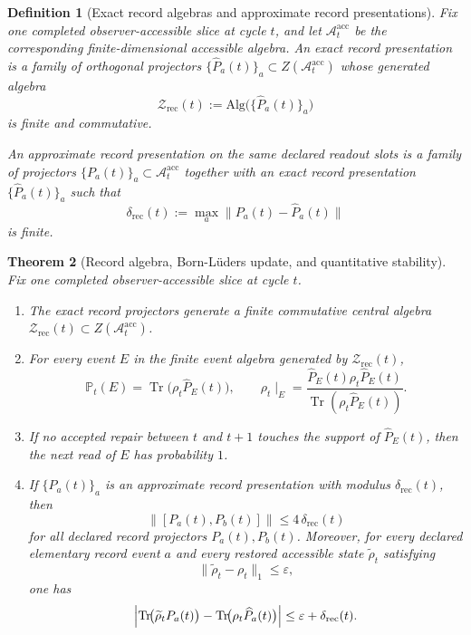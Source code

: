 \documentclass[11pt]{article}
\newtheorem{theorem}{Theorem}[section]
\newtheorem{definition}[theorem]{Definition}
\theoremstyle{remark}
\theoremstyle{plain}
\begin{document}
\begin{definition}[Exact record algebras and approximate record presentations]\label{def:lattice}
Fix one completed observer-accessible slice at cycle \(t\), and let
\(\mathcal A_t^{\mathrm{acc}}\) be the corresponding finite-dimensional accessible algebra. An
\emph{exact record presentation} is a family of orthogonal projectors
\(\{\widehat P_a(t)\}_a\subset Z(\mathcal A_t^{\mathrm{acc}})\) whose generated algebra
\[
\mathcal Z_{\mathrm{rec}}(t)
:=
\mathrm{Alg}\bigl(\{\widehat P_a(t)\}_a\bigr)
\]
is finite and commutative.

An \emph{approximate record presentation} on the same declared readout slots is a family of
projectors \(\{P_a(t)\}_a\subset \mathcal A_t^{\mathrm{acc}}\) together with an exact record
presentation \(\{\widehat P_a(t)\}_a\) such that
\[
\delta_{\mathrm{rec}}(t)
:=
\max_a \|P_a(t)-\widehat P_a(t)\|
\]
is finite.
\end{definition}

\begin{theorem}[Record algebra, Born-L\"uders update, and quantitative stability]\label{thm:crdt}
Fix one completed observer-accessible slice at cycle \(t\).
\begin{enumerate}
\item The exact record projectors generate a finite commutative central algebra
\(\mathcal Z_{\mathrm{rec}}(t)\subset Z(\mathcal A_t^{\mathrm{acc}})\).
\item For every event \(E\) in the finite event algebra generated by \(\mathcal Z_{\mathrm{rec}}(t)\),
\[
\mathbb P_t(E)=\operatorname{Tr}\!\bigl(\rho_t \widehat P_E(t)\bigr),
\qquad
\rho_t\!\mid_E
=
\frac{\widehat P_E(t)\rho_t \widehat P_E(t)}
{\operatorname{Tr}(\rho_t \widehat P_E(t))}.
\]
\item If no accepted repair between \(t\) and \(t+1\) touches the support of \(\widehat P_E(t)\),
then the next read of \(E\) has probability \(1\).
\item If \(\{P_a(t)\}_a\) is an approximate record presentation with modulus
\(\delta_{\mathrm{rec}}(t)\), then
\[
\|[P_a(t),P_b(t)]\|\le 4\,\delta_{\mathrm{rec}}(t)
\]
for all declared record projectors \(P_a(t),P_b(t)\). Moreover, for every declared elementary
record event \(a\) and every restored accessible state \(\widetilde\rho_t\) satisfying
\[
\|\widetilde\rho_t-\rho_t\|_1\le \varepsilon,
\]
one has
\[
\Bigl|
\operatorname{Tr}\!\bigl(\widetilde\rho_t P_a(t)\bigr)
-
\operatorname{Tr}\!\bigl(\rho_t \widehat P_a(t)\bigr)
\Bigr|
\le
\varepsilon+\delta_{\mathrm{rec}}(t).
\]
\end{enumerate}
\end{theorem}
\end{document}
